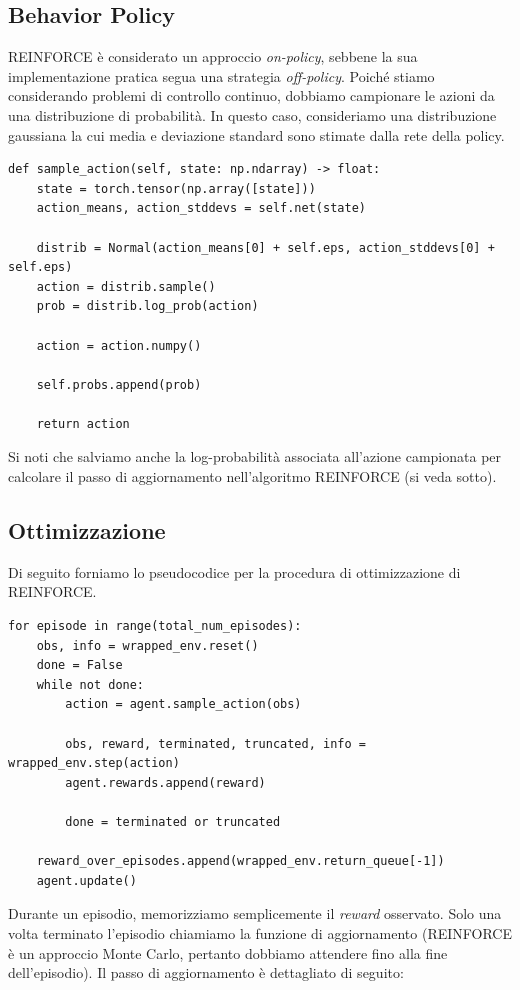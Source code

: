 ﻿\documentclass[11pt, a4paper]{report}
\begin{document}
\subsection{Behavior Policy}

REINFORCE è considerato un approccio \emph{on-policy}, sebbene la sua implementazione pratica segua una strategia \emph{off-policy}. Poiché stiamo considerando problemi di controllo continuo, dobbiamo campionare le azioni da una distribuzione di probabilità. In questo caso, consideriamo una distribuzione gaussiana la cui media e deviazione standard sono stimate dalla rete della policy.

\begin{verbatim}
def sample_action(self, state: np.ndarray) -> float:
    state = torch.tensor(np.array([state]))
    action_means, action_stddevs = self.net(state)

    distrib = Normal(action_means[0] + self.eps, action_stddevs[0] + self.eps)
    action = distrib.sample()
    prob = distrib.log_prob(action)

    action = action.numpy()

    self.probs.append(prob)

    return action
\end{verbatim}

Si noti che salviamo anche la log-probabilità associata all'azione campionata per calcolare il passo di aggiornamento nell'algoritmo REINFORCE (si veda sotto).

\subsection{Ottimizzazione}

Di seguito forniamo lo pseudocodice per la procedura di ottimizzazione di REINFORCE.

\begin{verbatim}
for episode in range(total_num_episodes):
    obs, info = wrapped_env.reset()
    done = False
    while not done:
        action = agent.sample_action(obs)

        obs, reward, terminated, truncated, info = wrapped_env.step(action)
        agent.rewards.append(reward)

        done = terminated or truncated

    reward_over_episodes.append(wrapped_env.return_queue[-1])
    agent.update()
\end{verbatim}

Durante un episodio, memorizziamo semplicemente il \emph{reward} osservato. Solo una volta terminato l'episodio chiamiamo la funzione di aggiornamento (REINFORCE è un approccio Monte Carlo, pertanto dobbiamo attendere fino alla fine dell'episodio). Il passo di aggiornamento è dettagliato di seguito:
\end{document}
